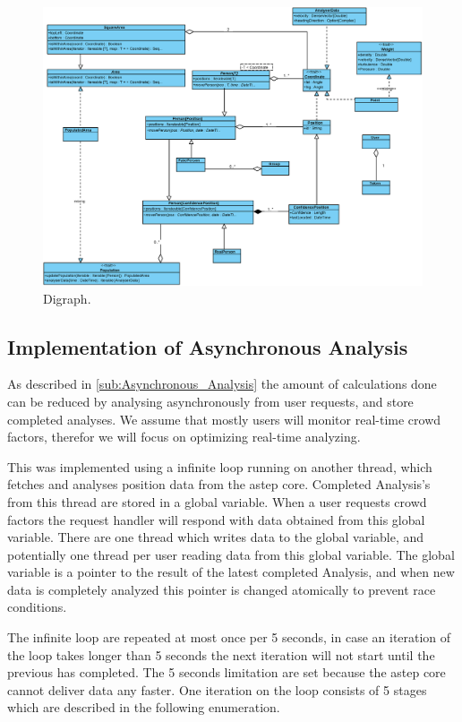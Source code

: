 \begin{figure}
\centering
\includegraphics[width=\linewidth]{figures/class.eps}
\caption{Digraph.}
\label{fig:class}
\end{figure}


\subsection{Implementation of Asynchronous Analysis}
\label{sub:implementation_of_asynchronous_analysis}

As described in \cref{sub:Asynchronous_Analysis} the amount of calculations done can be reduced by analysing asynchronously from user requests, and store completed analyses. We assume that mostly users will monitor real-time crowd factors, therefor we will focus on optimizing real-time analyzing.

This was implemented using a infinite loop running on another thread, which fetches and analyses position data from the astep core. Completed Analysis's from this thread are stored in a global variable. When a user requests crowd factors the request handler will respond with data obtained from this global variable. There are one thread which writes data to the global variable, and potentially one thread per user reading data from this global variable. The global variable is a pointer to the result of the latest completed Analysis, and when new data is completely analyzed this pointer is changed atomically to prevent race conditions. 

The infinite loop are repeated at most once per 5 seconds, in case an iteration of the loop takes longer than 5 seconds the next iteration will not start until the previous has completed. The 5 seconds limitation are set because the astep core cannot deliver data any faster. One iteration on the loop consists of 5 stages which are described in the following enumeration. 

